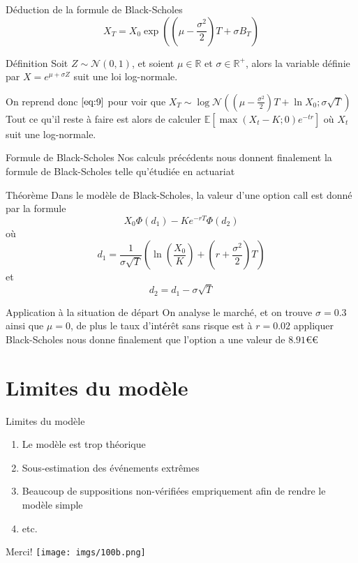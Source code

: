 \documentclass{beamer}
\newcommand{\1}{\mathmybb{1}}
\begin{document}
   \begin{frame}{Déduction de la formule de Black-Scholes}
\begin{equation} \label{eq:9}
       X_{T} = X_{0} \exp \left(  \left( \mu - \frac{\sigma^{2}}{2} \right) T + \sigma B_{T} \right)
     \end{equation}

     \pause
     \begin{block}{Définition}
       Soit $Z \sim \mathcal{N}\left(0, 1 \right)$, et soient $\mu \in \mathbb{R}$ et $\sigma \in \mathbb{R}^{+}$, alors la variable définie par $ X = e^{\mu + \sigma Z}$ suit une loi log-normale.
     \end{block}
     On reprend donc $ \ref{eq:9} $ pour voir que $X_{T} \sim \log \mathcal{N} \left( \left( \mu - \frac{\sigma^{2}}{2} \right) T + \ln X_{0}; \sigma \sqrt{T}  \right)$ \\
     \pause
     Tout ce qu'il reste à faire est alors de calculer $\mathbb{E}\left[\max(X_{t} - K; 0)e^{-tr}\right]$ où $ X_{t}$ suit une log-normale.
   \end{frame}
   \begin{frame}{Formule de Black-Scholes}
     Nos calculs précédents nous donnent finalement la formule de Black-Scholes telle qu'étudiée en actuariat
     \begin{block}{Théorème}
       Dans le modèle de Black-Scholes, la valeur d'une option call est donné par la formule
       \begin{equation}
         X_{0}\varPhi(d_{1}) - Ke^{-rT}\varPhi(d_{2})
       \end{equation}
       où
       \[
         d_{1} = \frac{1}{\sigma \sqrt{T}} \left( \ln \left(\frac{X_{0}}{K} \right) + \left( r + \frac{\sigma^{2}}{2} \right)T \right)
       \]
       et
       \[
         d_{2} = d_{1} - \sigma \sqrt{T}
       \]
    \end{block}
  \end{frame}
  \begin{frame}{Application à la situation de départ}
    On analyse le marché, et on trouve $ \sigma = 0.3$ ainsi que $ \mu = 0$, de plus le taux d'intérêt sans risque est à $r = 0.02$ appliquer Black-Scholes nous donne finalement que l'option a une valeur de $8.91€$€
  \end{frame}
  \section{Limites du modèle}
  \begin{frame}{Limites du modèle}
    \begin{enumerate}
      \item Le modèle est trop théorique
            \pause
      \item Sous-estimation des événements extrêmes
            \pause
      \item Beaucoup de suppositions non-vérifiées empriquement afin de rendre le modèle simple
            \pause
            \item etc.
    \end{enumerate}
  \end{frame}
  \begin{frame}{Merci!}
    \texttt{[image: imgs/100b.png]}
  \end{frame}
\end{document}
